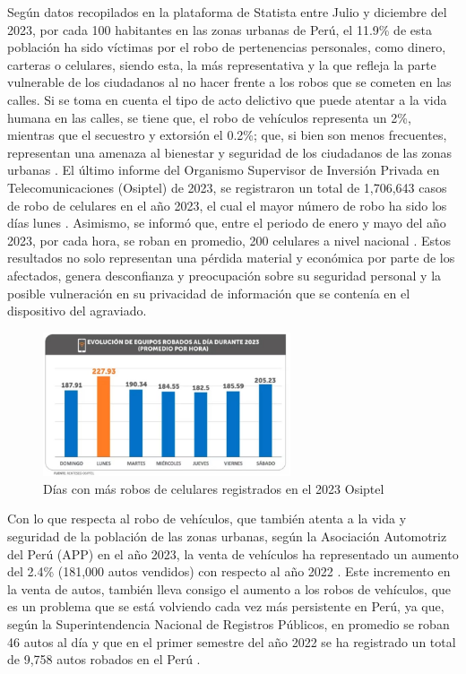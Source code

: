 Según datos recopilados en la plataforma de Statista entre Julio y diciembre del 2023, por cada 100 habitantes en las zonas urbanas de Perú, el 11.9\% de esta población ha sido víctimas por el robo de pertenencias personales, como dinero, carteras o celulares, siendo esta, la más representativa y la que refleja la parte vulnerable de los ciudadanos al no hacer frente a los robos que se cometen en las calles. Si se toma en cuenta el tipo de acto delictivo que puede atentar a la vida humana en las calles, se tiene que, el robo de vehículos representa un 2\%, mientras que el secuestro y extorsión el 0.2\%; que, si bien son menos frecuentes, representan una amenaza al bienestar y seguridad de los ciudadanos de las zonas urbanas \parencite{cu_statista2023}. El último informe del Organismo Supervisor de Inversión Privada en Telecomunicaciones (Osiptel) de 2023, se registraron un total de 1,706,643 casos de robo de celulares en el año 2023, el cual el mayor número de robo ha sido los días lunes \parencite{cu_infobae}. Asimismo, se informó que, entre el periodo de enero y mayo del año 2023, por cada hora, se roban en promedio, 200 celulares a nivel nacional \parencite{cu_comercio}. Estos resultados no solo representan una pérdida material y económica por parte de los afectados, genera desconfianza y preocupación sobre su seguridad personal y la posible vulneración en su privacidad de información que se contenía en el dispositivo del agraviado.
\begin{figure}[h]
	\begin{center}
		\includegraphics[width=0.65\textwidth]{1/figures/fig1.jpg}
		\caption{Días con más robos de celulares registrados en el 2023 Osiptel}
		\label{1:fig2}
	\end{center}
\end{figure}


Con lo que respecta al robo de vehículos, que también atenta a la vida y seguridad de la población de las zonas urbanas, según la Asociación Automotriz del Perú (APP) en el año 2023, la venta de vehículos ha representado un aumento del 2.4\% (181,000 autos vendidos) con respecto al año 2022 \parencite{cu_amcha}. Este incremento en la venta de autos, también lleva consigo el aumento a los robos de vehículos, que es un problema que se está volviendo cada vez más persistente en Perú, ya que, según la Superintendencia Nacional de Registros Públicos, en promedio se roban 46 autos al día y que en el primer semestre del año 2022 se ha registrado un total de 9,758 autos robados en el Perú \parencite{cu_track}. 

